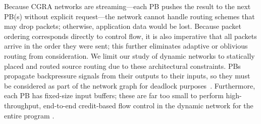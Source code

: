 Because CGRA networks are streaming---each PB pushes the result to the next PB(s) without explicit request---the network cannot handle routing schemes that may drop packets; otherwise, application data would be lost.
Because packet ordering corresponds directly to control flow, it is also imperative that all packets arrive in the order they were sent; this further eliminates adaptive or oblivious routing from consideration.
We limit our study of dynamic networks to statically placed and routed source routing due to these architectural constraints.
PBs propagate backpressure signals from their outputs to their inputs, so they must be considered as part of the network graph for deadlock purposes~\cite{hansson2007avoiding}.
Furthermore, each PB has fixed-size input buffers; these are far too small to perform high-throughput, end-to-end credit-based flow control in the dynamic network for the entire program \cite{wang2013avoiding}.
